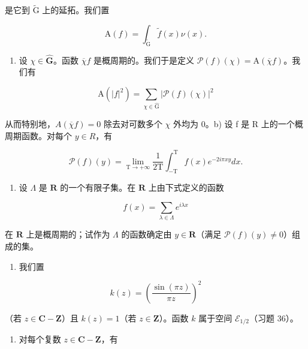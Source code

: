 是它到 \(\widetilde{\mathrm{G}}\) 上的延拓。我们置

\[
\mathrm{A} (f) = \int_ {\widetilde {\mathrm{G}}} \widetilde {f} (x) \nu (x).
\]

\begin{enumerate}
\def\labelenumi{\alph{enumi})}
\tightlist
\item
  设 \(\chi \in \widehat{\mathbf{G}}\)。函数 \(\overline{\chi} f\) 是概周期的。我们于是定义 \(\mathcal{P}(f)(\chi) = \mathrm{A}(\overline{\chi} f)\)。我们有
\end{enumerate}

\[
\mathrm{A} (| f | ^ {2}) = \sum_ {\chi \in \widehat {\mathrm{G}}} | \mathcal {P} (f) (\chi) | ^ {2}
\]

    从而特别地，\(A(\overline{\chi}f)=0\) 除去对可数多个 \(\chi\) 外均为 0。b) 设 f 是 R 上的一个概周期函数。对每个 \(y \in R\)，有

\[
\mathcal {P} (f) (y) = \lim _ {\mathrm{T} \to + \infty} \frac {1}{2 \mathrm{T}} \int_ {- \mathrm{T}} ^ {\mathrm{T}} f (x) e ^ {- 2 i \pi x y} d x.
\]

\begin{enumerate}
\def\labelenumi{\alph{enumi})}
\setcounter{enumi}{2}
\tightlist
\item
  设 \(\Lambda\) 是 \(\mathbf{R}\) 的一个有限子集。在 \(\mathbf{R}\) 上由下式定义的函数
\end{enumerate}

\[
f (x) = \sum_ {\lambda \in \Lambda} e ^ {i \lambda x}
\]

在 \(\mathbf{R}\) 上是概周期的；试作为 \(\Lambda\) 的函数确定由 \(y \in \mathbf{R}\)（满足 \(\mathcal{P}(f)(y) \neq 0\)）组成的集。

\begin{enumerate}
\def\labelenumi{\arabic{enumi})}
\setcounter{enumi}{55}
\tightlist
\item
  我们置
\end{enumerate}

\[
k (z) = \left(\frac {\sin (\pi z)}{\pi z}\right) ^ {2}
\]

（若 \(z \in \mathbf{C} - \mathbf{Z}\)）且 \(k(z) = 1\)（若 \(z \in \mathbf{Z}\)）。函数 \(k\) 属于空间 \(\mathcal{E}_{1/2}\)（习题 36）。

\begin{enumerate}
\def\labelenumi{\alph{enumi})}
\tightlist
\item
  对每个复数 \(z \in \mathbf{C} - \mathbf{Z}\)，有
\end{enumerate}

